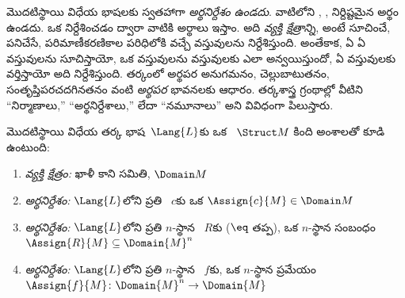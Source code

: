 \documentclass[../../../include/open-logic-section]{subfiles}
\begin{document}


\begin{explain}
మొదటిస్థాయి విధేయ భాషలకు స్వతహాగా \emph{అర్థనిర్దేశం ఉండదు}.
వాటిలోని , , 
నిర్దిష్టమైన అర్థం ఉండదు. ఒక  \emph{}
నిర్దేశించడం ద్వారా వాటికి అర్థాలు ఇస్తాం. అది \emph{వ్యక్తి క్షేత్రాన్ని},
అంటే  సూచించే,  పనిచేసే, పరిమాణీకరణికాల పరిధిలోకి
వచ్చే వస్తువులను నిర్దేశిస్తుంది. అంతేకాక, ఏ 
ఏ వస్తువులను సూచిస్తాయో, ఒక  వస్తువులను వస్తువులకు ఎలా
అన్వయిస్తుందో,  ఏ వస్తువులకు వర్తిస్తాయో అది నిర్దేశిస్తుంది.
తర్కంలో అర్థపర అనుగమనం, చెల్లుబాటుతనం, సంతృప్తిపరచదగినతనం వంటి
\emph{అర్థపర} భావనలకు  ఆధారం. తర్కశాస్త్ర గ్రంథాల్లో వీటిని
``నిర్మాణాలు,'' ``అర్థనిర్దేశాలు,'' లేదా ``నమూనాలు'' అని వివిధంగా
పిలుస్తారు.
\end{explain}

\begin{defn}
మొదటిస్థాయి విధేయ తర్క భాష~$\Lang{L}$కు ఒక 
\emph{}~$\Struct M$ కింది అంశాలతో కూడి ఉంటుంది:
\begin{enumerate}
\item \emph{వ్యక్తి క్షేత్రం:} ఖాళీ కాని సమితి, $\Domain M$
\item \emph{ అర్థనిర్దేశం:} $\Lang{L}$లోని ప్రతి
  ~$c$కు ఒక  $\Assign{c}{M} \in \Domain M$
\item \emph{ అర్థనిర్దేశం:} $\Lang{L}$లోని ప్రతి
  $n$-స్థాన ~$R$కు ($\eq$ తప్ప), ఒక $n$-స్థాన సంబంధం
  $\Assign{R}{M} \subseteq \Domain{M}^n$
\item \emph{ అర్థనిర్దేశం:} $\Lang{L}$లోని ప్రతి
  $n$-స్థాన ~$f$కు, ఒక $n$-స్థాన ప్రమేయం
  $\Assign{f}{M} \colon \Domain{M}^n \to \Domain{M}$
\end{enumerate}
\end{defn}
\end{document}
